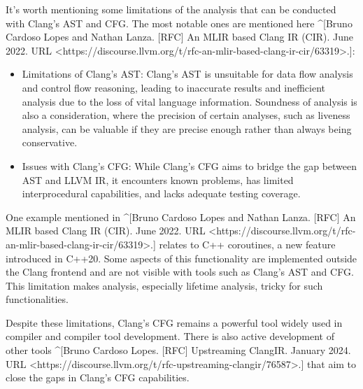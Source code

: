 \begin{markdown}
It's worth mentioning some limitations of the analysis that can be conducted with Clang's AST and CFG. The most notable ones are mentioned here ^[Bruno Cardoso Lopes and Nathan Lanza. [RFC] An MLIR based Clang IR (CIR). June 2022. URL <https://discourse.llvm.org/t/rfc-an-mlir-based-clang-ir-cir/63319>.]:
\end{markdown}

\begin{itemize}
\item
Limitations of Clang's AST: Clang's AST is unsuitable for data flow analysis and control flow reasoning, leading to inaccurate results and inefficient analysis due to the loss of vital language information. Soundness of analysis is also a consideration, where the precision of certain analyses, such as liveness analysis, can be valuable if they are precise enough rather than always being conservative.

\item
Issues with Clang's CFG: While Clang's CFG aims to bridge the gap between AST and LLVM IR, it encounters known problems, has limited interprocedural capabilities, and lacks adequate testing coverage.
\end{itemize}

\begin{markdown}
One example mentioned in ^[Bruno Cardoso Lopes and Nathan Lanza. [RFC] An MLIR based Clang IR (CIR). June 2022. URL <https://discourse.llvm.org/t/rfc-an-mlir-based-clang-ir-cir/63319>.] relates to C++ coroutines, a new feature introduced in C++20. Some aspects of this functionality are implemented outside the Clang frontend and are not visible with tools such as Clang's AST and CFG. This limitation makes analysis, especially lifetime analysis, tricky for such functionalities.

Despite these limitations, Clang's CFG remains a powerful tool widely used in compiler and compiler tool development. There is also active development of other tools ^[Bruno Cardoso Lopes. [RFC] Upstreaming ClangIR. January 2024. URL <https://discourse.llvm.org/t/rfc-upstreaming-clangir/76587>.] that aim to close the gaps in Clang's CFG capabilities.
\end{markdown}
